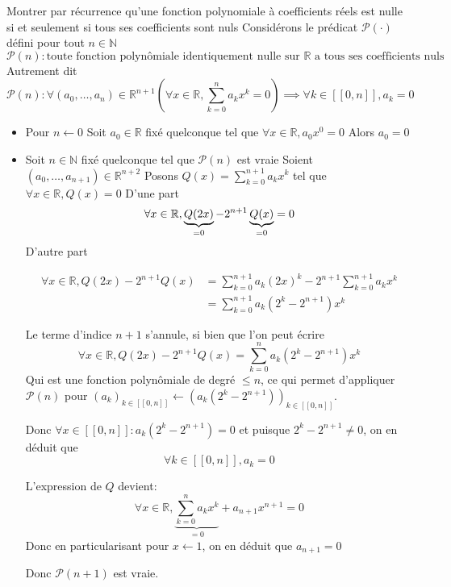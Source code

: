 \documentclass{article}
\begin{document}
\begin{question_kholle}{Montrer par récurrence qu'une fonction polynomiale à coefficients réels est nulle si et seulement si tous ses coefficients sont nuls}
    Considérons le prédicat $\mathcal{P}(\cdot)$ défini pour tout $n \in \mathbb{N}$
    $$
    \mathcal{P}(n) : \text{toute fonction polynômiale identiquement nulle sur }\mathbb{R} \text{ a tous ses coefficients nuls}
    $$
    Autrement dit
    $$
    \mathcal{P}(n) : \forall(a_{0}, \dots ,a_{n}) \in \mathbb{R}^{n+1}\left( \forall x \in \mathbb{R}, \sum_{k=0}^{n}a_{k}x^{k} = 0 \right) \implies \forall k \in [ \! [ 0, n ] \!], a_{k} = 0
    $$
    \begin{itemize}[label=$\lozenge$]
        \item Pour $n \leftarrow 0$
        Soit $a_{0} \in \mathbb{R}$ fixé quelconque tel que $\forall x \in \mathbb{R}, a_{0}x^{0} = 0$ Alors $a_{0} = 0$
        
        \item Soit $n \in \mathbb{N}$ fixé quelconque tel que $\mathcal{P}(n)$ est vraie
        Soient $(a_{0},\dots, a_{n+1}) \in \mathbb{R}^{n+2}$
        Posons $Q(x) = \sum_{k=0}^{n+1}a_{k}x^{k}$ tel que $\forall x \in \mathbb{R}, Q(x) = 0$
        D'une part
        $$
        \forall x \in \mathbb R, \underbrace{ Q(2x) }_{ =0 } - 2^{n+1}\underbrace{ Q(x) }_{ =0 } = 0
        $$
        D'autre part
        
        \begin{align*}
            \forall x \in \mathbb{R}, Q(2x) - 2^{n+1}Q(x) &= \sum_{k=0}^{n+1}a_{k}(2x)^{k}-2^{n+1}\sum_{k=0}^{n+1}a_{k}x^{k} \\
            &= \sum_{k=0}^{n+1}a_{k}(2^{k}-2^{n+1})x^{k}
        \end{align*}
        
        Le terme d'indice $n+1$ s'annule, si bien que l'on peut écrire
        $$\forall x \in \mathbb{R}, Q(2x) - 2^{n+1}Q(x) = \sum_{k=0}^{n}a_{k}(2^{k}-2^{n+1})x^{k}$$
        Qui est une fonction polynômiale de degré $\leqslant n$, ce qui permet d'appliquer $\mathcal{P}(n)$ pour $(a_{k})_{k \in[ \! [ 0, n ] \!]} \leftarrow (a_{k}(2^{k}-2^{n+1}))_{k \in[ \! [ 0, n ] \!]}$.
        
        Donc $\forall x \in [ \! [ 0, n ] \!]: a_{k}(2^{k}-2^{n+1}) = 0$ et puisque $2^{k}-2^{n+1} \neq 0$, on en déduit que $$\forall k \in [ \! [ 0, n ] \!], a_{k} = 0$$
        
        L'expression de $Q$ devient:
        $$
        \forall x \in \mathbb{R}, \underbrace{ \sum_{k=0}^{n}a_{k}x^{k} }_{ =0 }+ a_{n+1}x^{n+1} = 0
        $$
        Donc en particularisant pour $x\leftarrow 1$, on en déduit que $a_{n+1} = 0$
        
        Donc $\mathcal{P}(n+1)$ est vraie.
    \end{itemize}
\end{question_kholle}
\end{document}
